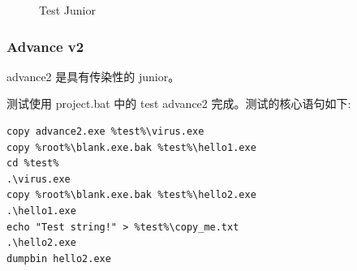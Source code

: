 \documentclass[UTF8]{ctexart}
\begin{document}
    \begin{figure}[H]
    \centering
        \caption{Test Junior}
        \label{fig:test-junior}
    \end{figure}
    
    \subsubsection{Advance v2}

    advance2 是具有传染性的 junior。

    测试使用 project.bat 中的 test advance2 完成。测试的核心语句如下:

    \begin{lstlisting}[caption={test advance2}, captionpos=b]
copy advance2.exe %test%\virus.exe
copy %root%\blank.exe.bak %test%\hello1.exe
cd %test%
.\virus.exe
copy %root%\blank.exe.bak %test%\hello2.exe
.\hello1.exe
echo "Test string!" > %test%\copy_me.txt
.\hello2.exe
dumpbin hello2.exe
    \end{lstlisting}
\end{document}
